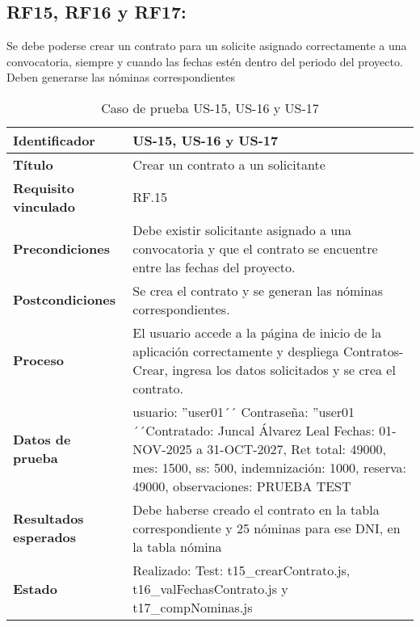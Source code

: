 \subsection{RF15, RF16 y RF17:} Se debe poderse crear un contrato para un solicite asignado correctamente a una convocatoria, siempre y cuando las fechas estén dentro del periodo del proyecto. Deben generarse las nóminas correspondientes
\begin{table}[H]
	\centering
	\renewcommand{\arraystretch}{1.3} 
	\begin{tabularx}{\textwidth}{|l|X|}
		\hline
		\textbf{Identificador} & US-15, US-16 y US-17 \\
		\hline
		\textbf{Título} &Crear un contrato a un solicitante	\\
		\hline
		\textbf{Requisito vinculado} & RF.15 \\
		\hline
		\textbf{Precondiciones} & Debe existir solicitante asignado a una convocatoria y que el contrato se encuentre entre las fechas del proyecto.\\
		\hline
		\textbf{Postcondiciones} & Se crea el contrato y se generan las nóminas correspondientes. \\
		\hline
		\textbf{Proceso} & El usuario accede a la página de inicio de la aplicación correctamente y despliega Contratos-Crear, ingresa los datos solicitados y se crea el contrato. \\
		\hline
		\textbf{Datos de prueba} & usuario: ''user01´´ Contraseña: ''user01´´Contratado: Juncal Álvarez Leal
		Fechas: 01-NOV-2025 a 31-OCT-2027, Ret total:  49000, mes: 1500, ss: 500, indemnización: 1000, reserva: 49000, observaciones: PRUEBA TEST
		\\
		\hline
		\textbf{Resultados esperados} & Debe haberse creado el contrato en la tabla correspondiente y 25 nóminas para ese DNI, en la tabla nómina \\
		\hline
		\textbf{Estado} & Realizado: Test: t15\_crearContrato.js, t16\_valFechasContrato.js y t17\_compNominas.js \\
		\hline
	\end{tabularx}
	\caption{Caso de prueba US-15, US-16 y US-17}
	\label{tab:caso_uso15}
\end{table}

